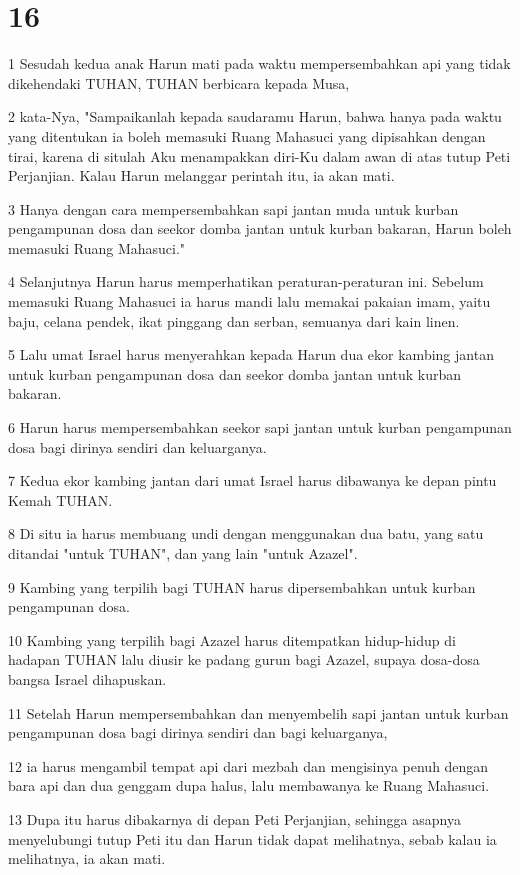 \chapter{16}

\par 1 Sesudah kedua anak Harun mati pada waktu mempersembahkan api yang tidak dikehendaki TUHAN, TUHAN berbicara kepada Musa,
\par 2 kata-Nya, "Sampaikanlah kepada saudaramu Harun, bahwa hanya pada waktu yang ditentukan ia boleh memasuki Ruang Mahasuci yang dipisahkan dengan tirai, karena di situlah Aku menampakkan diri-Ku dalam awan di atas tutup Peti Perjanjian. Kalau Harun melanggar perintah itu, ia akan mati.
\par 3 Hanya dengan cara mempersembahkan sapi jantan muda untuk kurban pengampunan dosa dan seekor domba jantan untuk kurban bakaran, Harun boleh memasuki Ruang Mahasuci."
\par 4 Selanjutnya Harun harus memperhatikan peraturan-peraturan ini. Sebelum memasuki Ruang Mahasuci ia harus mandi lalu memakai pakaian imam, yaitu baju, celana pendek, ikat pinggang dan serban, semuanya dari kain linen.
\par 5 Lalu umat Israel harus menyerahkan kepada Harun dua ekor kambing jantan untuk kurban pengampunan dosa dan seekor domba jantan untuk kurban bakaran.
\par 6 Harun harus mempersembahkan seekor sapi jantan untuk kurban pengampunan dosa bagi dirinya sendiri dan keluarganya.
\par 7 Kedua ekor kambing jantan dari umat Israel harus dibawanya ke depan pintu Kemah TUHAN.
\par 8 Di situ ia harus membuang undi dengan menggunakan dua batu, yang satu ditandai "untuk TUHAN", dan yang lain "untuk Azazel".
\par 9 Kambing yang terpilih bagi TUHAN harus dipersembahkan untuk kurban pengampunan dosa.
\par 10 Kambing yang terpilih bagi Azazel harus ditempatkan hidup-hidup di hadapan TUHAN lalu diusir ke padang gurun bagi Azazel, supaya dosa-dosa bangsa Israel dihapuskan.
\par 11 Setelah Harun mempersembahkan dan menyembelih sapi jantan untuk kurban pengampunan dosa bagi dirinya sendiri dan bagi keluarganya,
\par 12 ia harus mengambil tempat api dari mezbah dan mengisinya penuh dengan bara api dan dua genggam dupa halus, lalu membawanya ke Ruang Mahasuci.
\par 13 Dupa itu harus dibakarnya di depan Peti Perjanjian, sehingga asapnya menyelubungi tutup Peti itu dan Harun tidak dapat melihatnya, sebab kalau ia melihatnya, ia akan mati.

